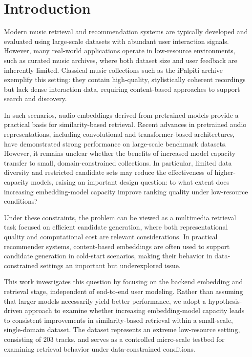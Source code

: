 \documentclass[sigconf]{acmart}
\begin{document}
\section{Introduction}\label{sec:introduction}

Modern music retrieval and recommendation systems are typically developed and evaluated using large-scale datasets with abundant user interaction signals. 
However, many real-world applications operate in low-resource environments, such as curated music archives, where both dataset size and user feedback are inherently limited. 
Classical music collections such as the iPalpiti archive exemplify this setting: they contain high-quality, stylistically coherent recordings but lack dense interaction data, requiring content-based approaches to support search and discovery.

In such scenarios, audio embeddings derived from pretrained models provide a practical basis for similarity-based retrieval. 
Recent advances in pretrained audio representations, including convolutional and transformer-based architectures, have demonstrated strong performance on large-scale benchmark datasets. 
However, it remains unclear whether the benefits of increased model capacity transfer to small, domain-constrained collections. In particular, limited data diversity and restricted candidate sets may reduce the effectiveness of higher-capacity models, raising an important design question: to what extent does increasing embedding-model capacity improve ranking quality under low-resource conditions?

Under these constraints, the problem can be viewed as a multimedia retrieval task focused on efficient candidate generation, where both representational quality and computational cost are relevant considerations. In practical recommender systems, content-based embeddings are often used to support candidate generation in cold-start scenarios, making their behavior in data-constrained settings an important but underexplored issue.

This work investigates this question by focusing on the backend embedding and retrieval stage, independent of end-to-end user modeling. Rather than assuming that larger models necessarily yield better performance, we adopt a hypothesis-driven approach to examine whether increasing embedding-model capacity leads to consistent improvements in similarity-based retrieval within a small-scale, single-domain dataset. The dataset represents an extreme low-resource setting, consisting of 203 tracks, and serves as a controlled micro-scale testbed for examining retrieval behavior under data-constrained conditions.
\end{document}
